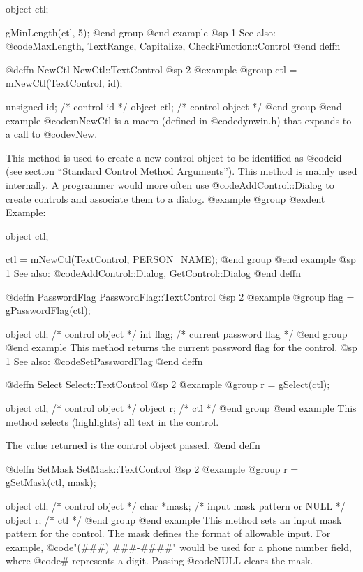object  ctl;

gMinLength(ctl, 5);
@end group
@end example
@sp 1
See also:  @code{MaxLength, TextRange, Capitalize, CheckFunction::Control}
@end deffn









@deffn {NewCtl} NewCtl::TextControl
@sp 2
@example
@group
ctl = mNewCtl(TextControl, id);

unsigned  id;   /*  control id      */
object   ctl;   /*  control object  */
@end group
@end example
@code{mNewCtl} is a macro (defined in @code{dynwin.h}) that expands to
a call to @code{vNew}.

This method is used to create a new control object to be identified as
@code{id} (see section ``Standard Control Method Arguments'').  This
method is mainly used internally.  A programmer would more often
use @code{AddControl::Dialog} to create controls and associate them
to a dialog.
@example
@group
@exdent Example:

object  ctl;

ctl = mNewCtl(TextControl, PERSON_NAME);
@end group
@end example
@sp 1
See also:  @code{AddControl::Dialog, GetControl::Dialog}
@end deffn



@deffn {PasswordFlag} PasswordFlag::TextControl
@sp 2
@example
@group
flag = gPasswordFlag(ctl);

object  ctl;    /*  control object      */
int     flag;   /*  current password flag  */
@end group
@end example
This method returns the current password flag for the control.
@sp 1
See also:  @code{SetPasswordFlag}
@end deffn



@deffn {Select} Select::TextControl
@sp 2
@example
@group
r = gSelect(ctl);

object  ctl;   /*  control object  */
object  r;     /*  ctl             */
@end group
@end example
This method selects (highlights) all text in the control.

The value returned is the control object passed.
@end deffn



@deffn {SetMask} SetMask::TextControl
@sp 2
@example
@group
r = gSetMask(ctl, mask);

object  ctl;    /*  control object  */
char    *mask;  /*  input mask pattern or NULL  */
object  r;      /*  ctl             */
@end group
@end example
This method sets an input mask pattern for the control.  The mask
defines the format of allowable input.  For example,
@code{"(###) ###-####"} would be used for a phone number field, where
@code{#} represents a digit.  Passing @code{NULL} clears the mask.

